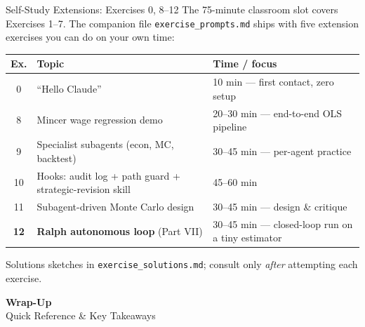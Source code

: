 \documentclass[aspectratio=169,10pt]{beamer}
\begin{document}
\begin{frame}{Self-Study Extensions: Exercises 0, 8--12}
\small
The 75-minute classroom slot covers Exercises 1--7. The companion file
\texttt{exercise\_prompts.md} ships with five extension exercises you can do
on your own time:

\vspace{0.4em}
\renewcommand{\arraystretch}{1.2}
\begin{tabular}{c p{4.5cm} p{6cm}}
\toprule
\textbf{Ex.} & \textbf{Topic} & \textbf{Time / focus} \\
\midrule
0  & ``Hello Claude'' & 10 min --- first contact, zero setup \\
8  & Mincer wage regression demo & 20--30 min --- end-to-end OLS pipeline \\
9  & Specialist subagents (econ, MC, backtest) & 30--45 min --- per-agent practice \\
10 & Hooks: audit log + path guard + strategic-revision skill & 45--60 min \\
11 & Subagent-driven Monte Carlo design & 30--45 min --- design \& critique \\
\textbf{12} & \textbf{Ralph autonomous loop} (Part VII) & 30--45 min --- closed-loop run on a tiny estimator \\
\bottomrule
\end{tabular}

\vspace{0.4em}
{\scriptsize Solutions sketches in \texttt{exercise\_solutions.md}; consult only
\emph{after} attempting each exercise.}
\end{frame}


\begin{frame}{}
\vfill
\begin{center}
{\Huge \textcolor{uzhblue}{\textbf{Wrap-Up}}}\\[12pt]
{\LARGE Quick Reference \& Key Takeaways}
\end{center}
\vfill
\end{frame}
\end{document}
